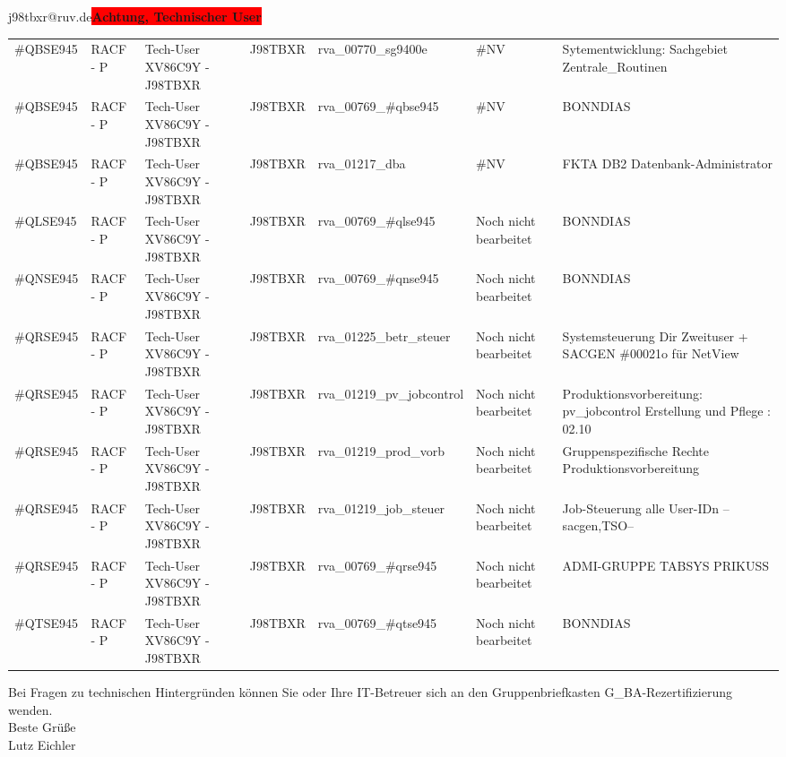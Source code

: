 \documentclass[a4paper,landscape,12pt]{letter}
\begin{document}
\begin{letter}{j98tbxr@ruv.de\space\space\space\space\space\space\space\space\space\bfseries\colorbox{red}{Achtung, Technischer User}\hfill \break}
\begin{tiny}
\begin{longtable}{|p{35mm}|p{15mm}|p{25mm}|p{10mm}|p{40mm}|p{50mm}|p{50mm}|}
\#QBSE945 & RACF - P & Tech-User XV86C9Y - J98TBXR & J98TBXR & rva\_00770\_sg9400e & \#NV & Sytementwicklung: Sachgebiet Zentrale\_Routinen \\
\#QBSE945 & RACF - P & Tech-User XV86C9Y - J98TBXR & J98TBXR & rva\_00769\_\#qbse945 & \#NV & BONNDIAS \\
\#QBSE945 & RACF - P & Tech-User XV86C9Y - J98TBXR & J98TBXR & rva\_01217\_dba & \#NV & FKTA DB2 Datenbank-Administrator \\
\#QLSE945 & RACF - P & Tech-User XV86C9Y - J98TBXR & J98TBXR & rva\_00769\_\#qlse945 & Noch nicht bearbeitet & BONNDIAS \\
\#QNSE945 & RACF - P & Tech-User XV86C9Y - J98TBXR & J98TBXR & rva\_00769\_\#qnse945 & Noch nicht bearbeitet & BONNDIAS \\
\#QRSE945 & RACF - P & Tech-User XV86C9Y - J98TBXR & J98TBXR & rva\_01225\_betr\_steuer & Noch nicht bearbeitet & Systemsteuerung Dir Zweituser + SACGEN \#00021o für NetView \\
\#QRSE945 & RACF - P & Tech-User XV86C9Y - J98TBXR & J98TBXR & rva\_01219\_pv\_jobcontrol & Noch nicht bearbeitet & Produktionsvorbereitung: pv\_jobcontrol Erstellung und Pflege : 02.10 \\
\#QRSE945 & RACF - P & Tech-User XV86C9Y - J98TBXR & J98TBXR & rva\_01219\_prod\_vorb & Noch nicht bearbeitet & Gruppenspezifische Rechte Produktionsvorbereitung \\
\#QRSE945 & RACF - P & Tech-User XV86C9Y - J98TBXR & J98TBXR & rva\_01219\_job\_steuer & Noch nicht bearbeitet & Job-Steuerung alle User-IDn --sacgen,TSO-- \\
\#QRSE945 & RACF - P & Tech-User XV86C9Y - J98TBXR & J98TBXR & rva\_00769\_\#qrse945 & Noch nicht bearbeitet & ADMI-GRUPPE TABSYS PRIKUSS \\
\#QTSE945 & RACF - P & Tech-User XV86C9Y - J98TBXR & J98TBXR & rva\_00769\_\#qtse945 & Noch nicht bearbeitet & BONNDIAS \\

\hline
		\end{longtable}
		\end{tiny}
	
\begin{minipage}{\textwidth}
			Bei Fragen zu technischen Hintergründen können Sie 
			oder Ihre IT-Betreuer sich an den Gruppenbriefkasten 
			G\_BA-Rezertifizierung
			wenden.\\
			\linebreak
			Beste Grüße\\
			Lutz Eichler
	\end{minipage}
	\end{letter}
	
\end{document}
